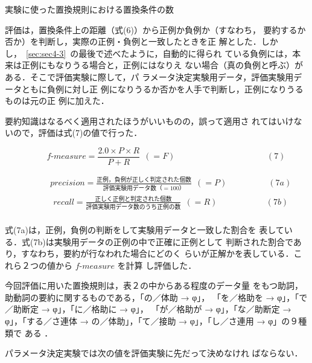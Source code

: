 \setcounter{table}{4}
\begin{table}
\begin{center}
\vspace{-3mm}
  \caption{実験に使った置換規則における置換条件の数}
  
\end{center}
\end{table}
評価は，置換条件上の距離（式(6)）から正例か負例か（すなわち，
要約するか否か）を判断し，実際の正例・負例と一致したときを正
解とした．しかし，~\ref{sec:sec4-3}~の最後で述べたように，自動的に得られ
ている負例には，本来は正例にもなりうる場合と，正例にはなりえ
ない場合（真の負例と呼ぶ）がある．そこで評価実験に際して，パ
ラメータ決定実験用データ，評価実験用データともに負例に対し正
例になりうるか否かを人手で判断し，正例になりうるものは元の正
例に加えた．

要約知識はなるべく適用されたほうがいいものの，誤って適用さ
れてはいけないので，評価は式(7)の値で行った．

$$ \ \ \ \ \ \ \ \ \ \ f‐measure = \frac{2.0 \times P \times R }{ P + R } \ \ (=F) \ \ \ \ \ \ \ \ \ \ \ \ \ \ \ \ \ \ \ \ \ \ \ \ \ \ \ \ \ \ \ \ \ \ \ \ \ \ \ \ \ \ \ \ \ \ \ \ \ (7)$$

\begin{eqnarray*}
 \ \ \ \ \ \ \ \ \ \ \ \ \ \ \ 
precision = \frac{正例，負例が正しく判定された個数}{評価実験用データ数（=100）} \ \ (=P)
 \ \ \ \ \ \ \ \ \ \ \ \ \ \ \ \ \ \ \ \ \ \ (7a)
\end{eqnarray*}
\begin{eqnarray*}
 \ \ \ \ \ \ \ \ \ \ \ \ \ \ \ 
recall = \frac{正しく正例と判定された個数}{評価実験用データ数のうち正例の数} \ \ (=R)
 \ \ \ \ \ \ \ \ \ \ \ \ \ \ \ \ \ \ \ \ \ \ \ \ \ \ (7b)
\end{eqnarray*}
\\
式(7a)は，正例，負例の判断をして実験用データと一致した割合を
表している．式(7b)は実験用データの正例の中で正確に正例として
判断された割合であり，すなわち，要約が行なわれた場合にどのく
らいが正解かを表している．これら２つの値から $f‐measure$ を計算
し評価した．

今回評価に用いた置換規則は，表２の中からある程度のデータ量
をもつ助詞，助動詞の要約に関するものである，「の／体助 → φ」，
「を／格助を → φ」，「で／助断定 → φ」，「に／格助に → φ」，
「が／格助が → φ」，「な／助断定 → φ」，「する／さ連体 → 
の／体助」，「て／接助 → φ」，「し／さ連用 → φ」の９種類で
ある ．

パラメータ決定実験では次の値を評価実験に先だって決めなけれ
ばならない．

